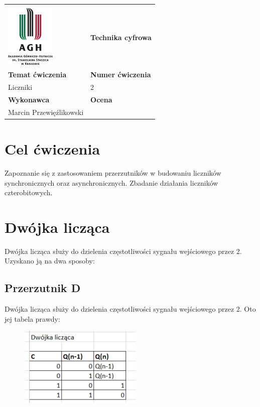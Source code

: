 \documentclass[12pt,a4paper]{article}
\begin{document}
\begin{table}[]
\label{my-label}
\begin{tabular}{|p{7.5cm}|p{7.5cm}|}
\hline
									           					&                           \\
\includegraphics[height=3cm]{logo}             					& \textbf{Technika cyfrowa} \\ \hline
\multicolumn{1}{|l|}{\textbf{Temat ćwiczenia}} 					& \textbf{Numer ćwiczenia}  \\
\multicolumn{1}{|l|}{Liczniki}	& 2                         \\ \hline
\multicolumn{1}{|l|}{\textbf{Wykonawca}}       & \textbf{Ocena}            \\
\multicolumn{1}{|l|}{Marcin Przewięźlikowski}          &                           \\ \hline
\end{tabular}
\end{table}

\section{Cel ćwiczenia}

Zapoznanie się z zastosowaniem przerzutników w budowaniu liczników synchronicznych oraz asynchronicznych. Zbadanie działania liczników czterobitowych.

\section{Dwójka licząca}


Dwójka licząca służy do dzielenia częstotliwości sygnału wejściowego przez 2. Uzyskano ją na dwa sposoby:

\subsection{Przerzutnik D}


Dwójka licząca służy do dzielenia częstotliwości sygnału wejściowego przez 2. Oto jej tabela prawdy:



\begin{figure}[H]
\centering
\includegraphics{img/4a_table}
\end{figure}
\end{document}
